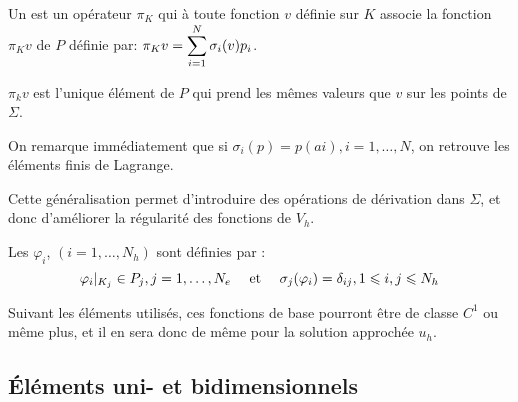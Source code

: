 \medskip
\begin{definition}
Un  est un opérateur $\pi_K$
qui à toute fonction $v$ définie sur $K$ associe la fonction $\pi_Kv$ de $P$ définie par:
$\colorred\pi_Kv=\dsum_{i=1}^N \sigma_i(v)p_i$.
\end{definition}

\medskip
$\pi_kv$ est l'unique élément de $P$ qui prend les mêmes valeurs que $v$ sur les
points de $\Sigma$.

\medskip
On remarque immédiatement que si $\sigma_i(p) = p(ai), i=1,\ldots, N$, on retrouve les éléments finis
de Lagrange.

Cette généralisation permet d'introduire des opérations de dérivation dans $\Sigma$,
et donc d'améliorer la régularité des fonctions de $V_h$.

\medskip
Les  $\varphi_i$, $(i=1,\ldots, N_h)$ sont
définies par :
\begin{equation}
\varphi_i|_{K_j} \in P_j, j=1,\ldots, N_e \quad \text{ et } \quad \colorred
\sigma_j(\varphi_i)=\delta_{ij}, 1\le i,j\le N_h
\end{equation}

Suivant les éléments utilisés, ces fonctions de base pourront être de classe $C^1$
ou même plus, et il en sera donc de même pour la solution approchée $u_h$.


\medskip
\subsection{Éléments uni- et bidimensionnels}

